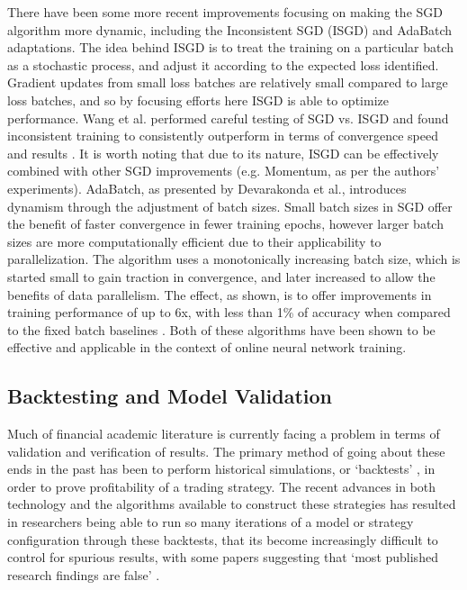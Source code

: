 \documentclass[a4paper,latin]{paper}
\begin{document}
There have been some more recent improvements focusing on making the SGD algorithm more dynamic, 
including the Inconsistent SGD (ISGD) and AdaBatch adaptations. The idea behind ISGD is to treat the training 
on a particular batch as a stochastic process, and adjust it according to the expected loss identified. Gradient 
updates from small loss batches are relatively small compared to large loss batches, and so by focusing efforts 
here ISGD is able to optimize performance. Wang et al. performed careful testing of SGD vs. ISGD and found 
inconsistent training to consistently outperform in terms of convergence speed and results \cite{Wang}. It is worth 
noting that due to its nature, ISGD can be effectively combined with other SGD improvements (e.g. Momentum, 
as per the authors’ experiments). AdaBatch, as presented by Devarakonda et al., introduces dynamism through 
the adjustment of batch sizes. Small batch sizes in SGD offer the benefit of faster convergence in fewer training 
epochs, however larger batch sizes are more computationally efficient due to their applicability to parallelization. 
The algorithm uses a monotonically increasing batch size, which is started small to gain traction in convergence, 
and later increased to allow the benefits of data parallelism. The effect, as shown, is to offer improvements in 
training performance of up to 6x, with less than 1\% of accuracy when compared to the fixed batch baselines \cite{Devarakonda}. 
Both of these algorithms have been shown to be effective and applicable in the context of online neural network training.
\hfill\break

\subsection{Backtesting and Model Validation} \label{lr_backtesting}
\hfill

Much of financial academic literature is currently facing a problem in terms of validation and verification of results. 
The primary method of going about these ends in the past has been to perform historical simulations, or ‘backtests’ ,
in order to prove profitability of a trading strategy. The recent advances in both technology and the algorithms available 
to construct these strategies has resulted in researchers being able to run so many iterations of a model or strategy
 configuration through these backtests, that its become increasingly difficult to control for spurious results, with some 
 papers suggesting that ‘most published research findings are false’   \cite{Ioannidis}.
\hfill \break 
\end{document}
